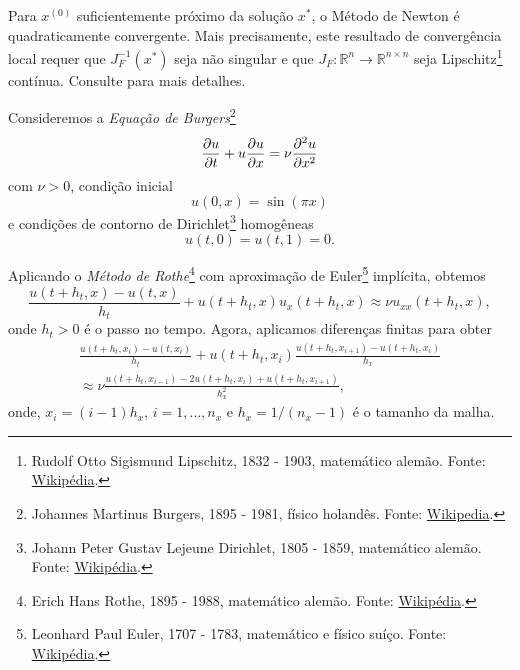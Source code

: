\begin{obs}\label{obs:convNewton}
  Para $x^{(0)}$ suficientemente próximo da solução $x^*$, o Método de Newton é quadraticamente convergente. Mais precisamente, este resultado de convergência local requer que $J_F^{-1}(x^*)$ seja não singular e que $J_F:\mathbb{R}^n\to\mathbb{R}^{n\times n}$ seja Lipschitz\footnote{Rudolf Otto Sigismund Lipschitz, 1832 - 1903, matemático alemão. Fonte: \href{https://en.wikipedia.org/wiki/Rudolf_Lipschitz}{Wikipédia}.} contínua. Consulte \cite[Seção 7.1]{Quarteroni2007} para mais detalhes.
\end{obs}

\begin{ex}\label{ex:burgers}
  Consideremos a \emph{Equação de Burgers}\footnote{Johannes Martinus Burgers, 1895 - 1981, físico holandês. Fonte: \href{https://en.wikipedia.org/wiki/Jan_Burgers}{Wikipedia}.}
  \begin{equation}
    \frac{\partial u}{\partial t} + u\frac{\partial u}{\partial x} = \nu\frac{\partial^2 u}{\partial x^2}
  \end{equation}
  com $\nu>0$, condição inicial
  \begin{equation}
    u(0,x) = \sin(\pi x)
  \end{equation}
  e condições de contorno de Dirichlet\footnote{Johann Peter Gustav Lejeune Dirichlet, 1805 - 1859, matemático alemão. Fonte: \href{https://pt.wikipedia.org/wiki/Johann_Peter_Gustav_Lejeune_Dirichlet}{Wikipédia}.} homogêneas
  \begin{equation}
    u(t,0) = u(t,1) = 0.
  \end{equation}

  Aplicando o \emph{Método de Rothe}\footnote{Erich Hans Rothe, 1895 - 1988, matemático alemão. Fonte: \href{https://pt.wikipedia.org/wiki/Erich_Rothe}{Wikipédia}.} com aproximação de Euler\footnote{Leonhard Paul Euler, 1707 - 1783, matemático e físico suíço. Fonte: \href{https://pt.wikipedia.org/wiki/Leonhard_Euler}{Wikipédia}.} implícita, obtemos
  \begin{equation}
    \frac{u(t+h_t,x) - u(t,x)}{h_t} + u(t+h_t,x)u_x(t+h_t,x) \approx \nu u_{xx}(t+h_t,x),
  \end{equation}
  onde $h_t>0$ é o passo no tempo. Agora, aplicamos diferenças finitas para obter
  \begin{gather}
    \frac{u(t+h_t,x_i) - u(t,x_i)}{h_t} + u(t+h_t, x_i)\frac{u(t+h_t,x_{i+1})-u(t+h_t,x_i)}{h_x} \\
    \approx \nu\frac{u(t+h_t,x_{i-1}) - 2u(t+h_t,x_i) + u(t+h_t,x_{i+1})}{h_x^2},
  \end{gather}
  onde, $x_i=(i-1)h_x$, $i=1,\dotsc,n_x$ e $h_x=1/(n_x-1)$ é o tamanho da malha.


\end{ex}
